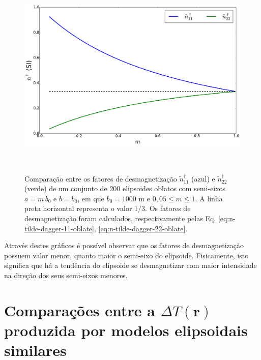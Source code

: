 \begin{figure}[hbt!]
	\centering \includegraphics[width=15cm,height=10cm]{figures/test_n_oblate}
	\caption[Comparação entre os fatores de desmagnetização $\tilde{n}^{\dagger}_{11}$ (azul) e $\tilde{n}^{\dagger}_{22}$ (verde) de um conjunto de 200 elipsoides oblatos com semi-eixos $a=m\, b_0$ e $b=b_0$, em que $b_0=1000$ m e $0,05 \le m \le 1$. A linha preta horizontal representa o valor $1/3$. Os fatores de desmagnetização foram calculados, respectivamente pelas Eq. \ref{eq:n-tilde-dagger-11-oblate}, \ref{eq:n-tilde-dagger-22-oblate}.]{Comparação entre os fatores de desmagnetização $\tilde{n}^{\dagger}_{11}$ (azul) e $\tilde{n}^{\dagger}_{22}$ (verde) de um conjunto de 200 elipsoides oblatos com semi-eixos $a=m\, b_0$ e $b=b_0$, em que $b_0=1000$ m e $0,05 \le m \le 1$. A linha preta horizontal representa o valor $1/3$. Os fatores de desmagnetização foram calculados, respectivamente pelas Eq. \ref{eq:n-tilde-dagger-11-oblate}, \ref{eq:n-tilde-dagger-22-oblate}.}
	\label{fig:n_oblato}
\end{figure}

Através destes gráficos é possível observar que os fatores de desmagnetização possuem valor menor, quanto maior o semi-eixo do elipsoide. Fisicamente, isto significa que há a tendência do elipsoide se desmagnetizar com maior intensidade na direção dos seus semi-eixos menores.
\newpage

\section{Comparações entre a $\Delta T (\mathbf{r})$ produzida por modelos elipsoidais similares}

